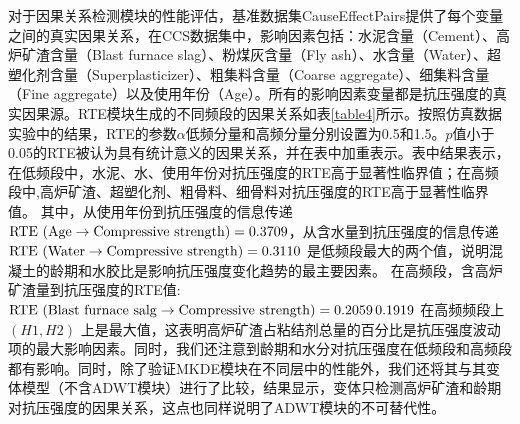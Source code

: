 对于因果关系检测模块的性能评估，基准数据集CauseEffectPairs提供了每个变量之间的真实因果关系，在CCS数据集中，影响因素包括：水泥含量（Cement）、高炉矿渣含量（Blast furnace slag）、粉煤灰含量（Fly ash）、水含量（Water）、超塑化剂含量（Superplasticizer）、粗集料含量（Coarse aggregate）、细集料含量（Fine aggregate）以及使用年份（Age）。所有的影响因素变量都是抗压强度的真实因果源。RTE模块生成的不同频段的因果关系如表\ref{table4}所示。按照仿真数据实验中的结果，RTE的参数$\alpha$低频分量和高频分量分别设置为0.5和1.5。$p$值小于0.05的RTE被认为具有统计意义的因果关系，并在表中加重表示。表中结果表示，在低频段中，水泥、水、使用年份对抗压强度的RTE高于显著性临界值；在高频段中,高炉矿渣、超塑化剂、粗骨料、细骨料对抗压强度的RTE高于显著性临界值。 其中，从使用年份到抗压强度的信息传递 ${\rm RTE}~(\rm{Age} \rightarrow \rm{Compressive \ strength}) = 0.3709$，从含水量到抗压强度的信息传递 ${\rm RTE}~(\rm{Water} \rightarrow \rm{Compressive \ strength}) = 0.3110$  是低频段最大的两个值，说明混凝土的龄期和水胶比是影响抗压强度变化趋势的最主要因素。 在高频段，含高炉矿渣量到抗压强度的RTE值:  ${\rm RTE}~(\rm{Blast\ furnace\ salg} \rightarrow \rm{Compressive \ strength}) = 0.2059\, 0.1919$ 在高频频段上 $(H1, H2)$ 上是最大值，这表明高炉矿渣占粘结剂总量的百分比是抗压强度波动项的最大影响因素。同时，我们还注意到龄期和水分对抗压强度在低频段和高频段都有影响。同时，除了验证MKDE模块在不同层中的性能外，我们还将其与其变体模型（不含ADWT模块）进行了比较，结果显示，变体只检测高炉矿渣和龄期对抗压强度的因果关系，这点也同样说明了ADWT模块的不可替代性。

